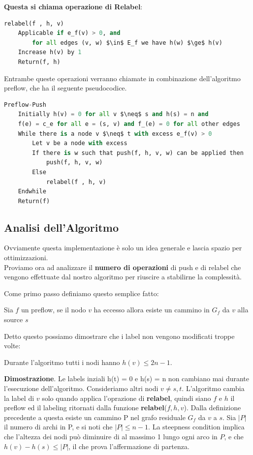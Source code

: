 \textbf{Questa si chiama operazione di Relabel}:
\begin{lstlisting}[language=Python, mathescape=true]
relabel(f , h, v)
    Applicable if e_f(v) > 0, and
        for all edges (v, w) $\in$ E_f we have h(w) $\ge$ h(v)
    Increase h(v) by 1
    Return(f, h)
\end{lstlisting}

Entrambe queste operazioni verranno chiamate in combinazione dell'algoritmo preflow, che ha il seguente pseudocodice.

\begin{lstlisting}[language=Python, mathescape=true]
Preflow-Push
    Initially h(v) = 0 for all v $\neq$ s and h(s) = n and
    f(e) = c_e for all e = (s, v) and f_(e) = 0 for all other edges
    While there is a node v $\neq$ t with excess e_f(v) > 0
        Let v be a node with excess
        If there is w such that push(f, h, v, w) can be applied then
            push(f, h, v, w)
        Else
            relabel(f , h, v)
    Endwhile
    Return(f)
\end{lstlisting}

\subsection{Analisi dell'Algoritmo}
Ovviamente questa implementazione è solo un idea generale e lascia spazio per ottimizzazioni.\\

Proviamo ora ad analizzare il \textbf{numero di operazioni} di push e di relabel che vengono effettuate dal nostro algoritmo per riuscire a stabilirne la complessità.

Come primo passo definiamo questo semplice fatto:
\begin{myblockquote}
    Sia $f$ un preflow, se il nodo $v$ ha eccesso allora esiste un cammino in $G_f$ da $v$ alla source $s$
\end{myblockquote}

Detto questo possiamo dimostrare che i label non vengono modificati troppe volte:
\begin{myblockquote}
    Durante l'algoritmo tutti i nodi hanno $h(v) \le 2n-1$.
\end{myblockquote}

\textbf{Dimostrazione}. Le labels inziali h(t) = 0 e h(s) = n non cambiano mai durante 
l'esecuzione dell'algoritmo. Consideriamo altri nodi $v \neq s, t$. L'algoritmo cambia la 
label di $v$ solo quando applica l'oprazione di \textbf{relabel}, quindi siano $f$ e $h$ il 
preflow ed il labeling ritornati dalla funzione \textbf{relabel}($f , h, v$). Dalla 
definizione precedente a questa esiste un cammino P nel grafo residuale $G_f$ da $v$ a $s$. 
Sia $|P|$ il numero di archi in P, e si noti che $|P| \leq n - 1$. La steepness condition 
implica che l'altezza dei nodi può diminuire di al massimo 1 lungo ogni arco in $P$, e che 
$h(v) - h(s) \leq |P|$, il che prova l'affermazione di partenza.\\

